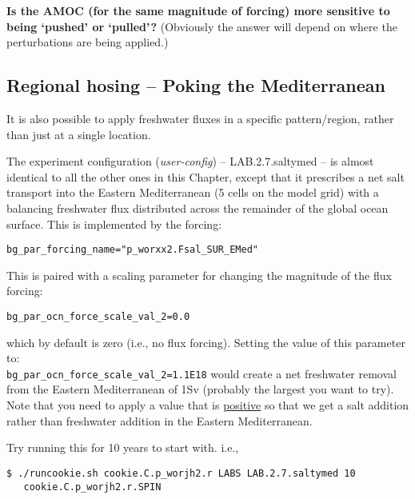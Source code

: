 \textbf{Is the AMOC (for the same magnitude of forcing) more sensitive to being ‘pushed’ or ‘pulled’?} (Obviously the answer will  depend on where the perturbations are being applied.)


\subsection{Regional hosing -- Poking the Mediterranean}

\noindent It is also possible to apply freshwater fluxes in a specific pattern/region, rather than just at a single location.

The experiment configuration (\textit{user-config}) -- \textsf{\footnotesize LAB.2.7.saltymed} -- is almost identical to all the other ones in this Chapter, except that it prescribes a net salt transport into the Eastern Mediterranean (5 cells on the model grid) with a balancing freshwater flux distributed across the remainder of the global ocean surface. This is implemented by the forcing:

\vspace{-2mm}\small\begin{verbatim}
bg_par_forcing_name="p_worxx2.Fsal_SUR_EMed"
\end{verbatim}\normalsize\vspace{-2mm}

\noindent This is paired with a scaling parameter for changing the magnitude of the flux forcing:

\vspace{-2mm}\small\begin{verbatim}
bg_par_ocn_force_scale_val_2=0.0
\end{verbatim}\normalsize\vspace{-2mm}

\noindent which by default is zero (i.e., no flux forcing). Setting the value of this parameter to: \\\texttt{bg\_par\_ocn\_force\_scale\_val\_2=1.1E18} would create a net freshwater removal from the Eastern Mediterranean of 1Sv (probably the largest you want to try). Note that you need to apply a value that is \uline{positive} so that we get a salt addition rather than freshwater addition in the Eastern Mediterranean.

\vspace{1mm}
Try running this for 10 years to start with. i.e.,

\vspace{-2mm}\small\begin{verbatim}
$ ./runcookie.sh cookie.C.p_worjh2.r LABS LAB.2.7.saltymed 10 
   cookie.C.p_worjh2.r.SPIN
\end{verbatim}\normalsize\vspace{-2mm}

